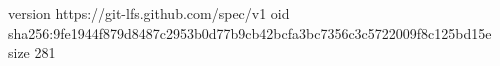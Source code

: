 version https://git-lfs.github.com/spec/v1
oid sha256:9fe1944f879d8487c2953b0d77b9cb42bcfa3bc7356c3c5722009f8c125bd15e
size 281
